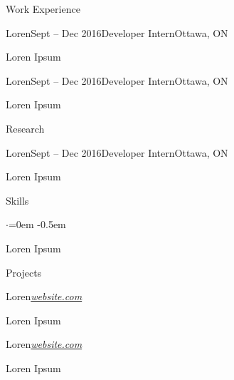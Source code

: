\documentclass{resume} %
\begin{document}

\begin{rSection}{Work Experience}
  \begin{rSubsection}{Loren}{Sept -- Dec 2016}{Developer Intern}{Ottawa, ON}
    \item Loren Ipsum
  \end{rSubsection}

  \begin{rSubsection}{Loren}{Sept -- Dec 2016}{Developer Intern}{Ottawa, ON}
    \item Loren Ipsum
  \end{rSubsection}
\end{rSection}


\begin{rSection}{Research}
  \begin{rSubsection}{Loren}{Sept -- Dec 2016}{Developer Intern}{Ottawa, ON}
    \item Loren Ipsum
  \end{rSubsection}
\end{rSection}


\begin{rSection}{Skills}
  \vspace {0.5em}
  \begin{list}{$\cdot$}{\leftmargin=0em}
     \itemsep -0.5em \vspace{-0.5em}
     \item Loren Ipsum
  \end{list}
  \vspace{0.5em}
\end{rSection}


\begin{rSection}{Projects}
  \begin{rSubsection}{Loren}{\em \href{http://website.com}{website.com}}{}

    \item Loren Ipsum
  \end{rSubsection}

  \begin{rSubsection}{Loren}{\em \href{http://website.com}{website.com}}{}

    \item Loren Ipsum
  \end{rSubsection}
\end{rSection}
\end{document}
